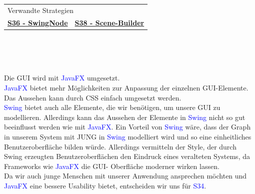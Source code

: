 \documentclass[enabledeprecatedfontcommands,fontsize=11pt,paper=a4,twoside]{scrartcl}
\newcounter{one}
\newcommand{\cb}[1]{{\textcolor{blue}{#1}}}
\begin{document}
	\begin{tabular} {|p{8cm} p{8cm}|}
		\hline
		\multicolumn{2}{|l|}{Verwandte Strategien} \\
		\textbf{\hyperlink{lll}{S36 - SwingNode}}&
		\textbf{\hyperlink{mmm}{S38 - Scene-Builder}}\\
		\hline
	\end{tabular}\\ \\ \\
	\begin{onehalfspace}
		Die GUI wird mit \cb{JavaFX} umgesetzt. \\
		\cb{JavaFX} bietet mehr Möglichkeiten zur Anpassung der einzelnen GUI-Elemente. Das Aussehen kann durch CSS einfach umgesetzt werden. \\
		\cb{Swing} bietet auch alle Elemente, die wir benötigen, um unsere GUI zu modellieren. Allerdings kann das Aussehen der Elemente in \cb{Swing} nicht so gut beeinflusst werden wie mit \cb{JavaFX}. Ein Vorteil von \cb{Swing} wäre, dass der Graph in unserem System mit JUNG in \cb{Swing} modelliert wird und so eine einheitliches Benutzeroberfläche bilden würde. Allerdings vermitteln der Style, der durch Swing erzeugten Benutzeroberflächen den Eindruck eines veralteten Systems, da Frameworks wie \cb{JavaFX} die GUI- Oberfläche moderner wirken lassen. \\
		Da wir auch junge Menschen mit unserer Anwendung ansprechen möchten und \cb{JavaFX} eine bessere Usability bietet, entscheiden wir uns für \cb{S34}.
	\end{onehalfspace}
	\newpage
\end{document}
